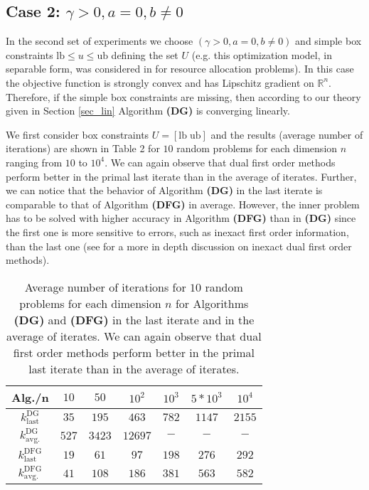 \documentclass{gOMS2e}
\theoremstyle{plain}
\theoremstyle{definition}
\theoremstyle{remark}
\begin{document}
\subsection{Case 2: $\gamma>0, a  = 0, b \not =0$}
\noindent In the second set of experiments we choose $(\gamma>0, a
= 0,  b \not =0)$  and simple box constraints $\text{lb} \leq u \leq
\text{ub}$ defining the set $U$ (e.g. this optimization model, in separable form, was
considered  in \cite{XiaBoy:06} for resource allocation problems).
In this case the objective function is strongly convex and has
Lipschitz gradient on ${\mathbb{R}}^n$. Therefore, if the simple box constraints   are
missing,  then according to our theory given in Section
\ref{sec_lin} Algorithm \textbf{(DG)} is converging linearly.

\noindent We first  consider  box constraints $U=[\text{lb} \; \text{ub}]$
and the results (average number of iterations) are shown in Table 2
for $10$ random problems for each dimension $n$ ranging from $10$ to
$10^4$. We can again observe that dual first order methods perform
better in the primal last iterate than in the average of iterates. Further, we can notice
that the behavior of Algorithm \textbf{(DG)} in the last iterate is
comparable to that of Algorithm \textbf{(DFG)} in average. However,
the inner problem has to be solved with higher accuracy in Algorithm
\textbf{(DFG)} than in \textbf{(DG)} since the first one is more
sensitive to errors, such as inexact first order information, than
the last one (see \cite{NecNed:13} for a more in depth discussion on inexact dual
first order methods).
\begin{table*}[ht]
\label{table_ns} \centering \caption{Average number of iterations
for $10$ random problems for each dimension $n$ for Algorithms
\textbf{(DG)} and \textbf{(DFG)} in the last iterate and in the
average of iterates. We can again observe that dual first order methods perform
better in the primal last iterate than in the average of iterates.}
\begin{tabular}{|c|c|c|c|c|c|c|}
\hline Alg./n                     & $10$  & $50$  & $10^2$  &  $10^3$   & $5*10^3$  &  $10^4$  \\
\hline
$k_{\mathrm{last}}^{\mathrm{DG}}$ & $35$  & $195$ & $463$ & $782$  &  $1147$   &  $2155$\\
\hline

$k_{\mathrm{avg.}}^\mathrm{DG}$  & $527$ & $3423$ & $12697$ & $-$ & $-$ & $-$ \\
\hline \hline

$k_{\mathrm{last}}^{\mathrm{DFG}}$  & $19$   & $61$ & $97$  & $198$    & $276$    & $292$ \\
\hline

$k_{\mathrm{avg.}}^{\mathrm{DFG}}$ & $41$    & $108$ & $186$  & $381$  & $563$   & $582$ \\
\hline
\end{tabular}
\end{table*}
\end{document}
